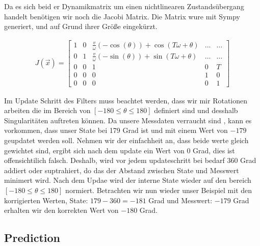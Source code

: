 \documentclass[11pt,oneside,openright]{mpreport}
\begin{document}
Da es sich beid er Dynamikmatrix um einen nichtlinearen Zustandsübergang handelt benötigen wir noch die Jacobi Matrix.
Die Matrix wure mit Sympy generiert, und auf Grund ihrer Größe eingekürzt.
 
 
\begin{align*}
J(\vec{x})=
\begin{bmatrix}
1 & 0 & \frac{v}{\omega} (-\cos(\theta)) + \cos(T \omega + \theta)& \dots & \dots \\
0 & 1 & \frac{v}{\omega} (-\sin(\theta)) + \sin(T \omega + \theta)& \dots & \dots \\
0 & 0 & 1 & 0 & T\\
0 & 0 & 0 & 1 & 0\\
0 & 0 & 0 & 0 & 1
\end{bmatrix} 
\end{align*}

Im Update Schritt des Filters muss beachtet werden, dass wir mir Rotationen arbeiten die im Bereich von $[-180 \le \theta \le 180]$ definiert sind und desshalb Singularitäten auftreten können.
Da unsere Messdaten verraucht sind , kann es vorkommen, dass unser State bei 179 Grad ist und mit einem Wert von $-179$ geupdatet werden soll. Nehmen wir der einfachheit an,
dass beide werte gleich gewichtet sind, ergibt sich nach dem update ein Wert von 0 Grad, dies ist offensichtilich falsch. Deshalb, wird vor jedem updateschritt bei bedarf
$360$ Grad addiert oder suptrahiert, do das der Abstand zwischen State und Messwert minimert wird. Nach dem Updae wird der interne State wieder auf den bereich $[-180 \le \theta \le 180]$ normiert.
Betrachten wir nun wieder unser Beispiel mit den korrigierten Werten, State: $179-360=-181$ Grad und Messwert: $-179$ Grad erhalten wir den korrekten Wert von $-180$ Grad.

\subsection{Prediction}
\end{document}
